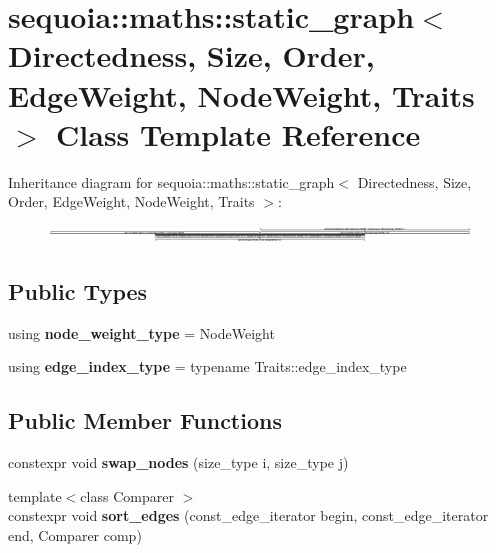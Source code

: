 \hypertarget{classsequoia_1_1maths_1_1static__graph}{}\section{sequoia\+::maths\+::static\+\_\+graph$<$ Directedness, Size, Order, Edge\+Weight, Node\+Weight, Traits $>$ Class Template Reference}
\label{classsequoia_1_1maths_1_1static__graph}
Inheritance diagram for sequoia\+::maths\+::static\+\_\+graph$<$ Directedness, Size, Order, Edge\+Weight, Node\+Weight, Traits $>$\+:\begin{figure}[H]
\begin{center}
\leavevmode
\includegraphics[height=0.455470cm]{classsequoia_1_1maths_1_1static__graph}
\end{center}
\end{figure}
\subsection*{Public Types}
\begin{DoxyCompactItemize}
\item 
\mbox{\label{classsequoia_1_1maths_1_1static__graph_aa42c0f1f2d4be553a3c97e45f95a79eb}} 
using {\bfseries node\+\_\+weight\+\_\+type} = Node\+Weight
\item 
\mbox{\label{classsequoia_1_1maths_1_1static__graph_a8beba8ca5d0ae5fc2ab90342a0349683}} 
using {\bfseries edge\+\_\+index\+\_\+type} = typename Traits\+::edge\+\_\+index\+\_\+type
\end{DoxyCompactItemize}
\subsection*{Public Member Functions}
\begin{DoxyCompactItemize}
\item 
\mbox{\label{classsequoia_1_1maths_1_1static__graph_a47bacd2540cedc9108116af317276621}} 
constexpr void {\bfseries swap\+\_\+nodes} (size\+\_\+type i, size\+\_\+type j)
\item 
\mbox{\label{classsequoia_1_1maths_1_1static__graph_abd685fa53183f904e92e1a6b5f6234b2}} 
{\footnotesize template$<$class Comparer $>$ }\\constexpr void {\bfseries sort\+\_\+edges} (const\+\_\+edge\+\_\+iterator begin, const\+\_\+edge\+\_\+iterator end, Comparer comp)
\end{DoxyCompactItemize}
